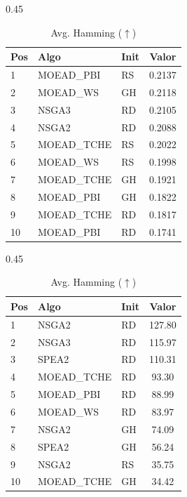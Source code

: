 \documentclass[a4paper,10pt]{article} %
\begin{document}
\begin{table}[H]
    \centering
    \begin{subtable}[t]{0.45\textwidth}
        \centering
        \caption{Avg. Tolerance Rate ($\uparrow$)}
        \begin{tabular}{lllc}
            \toprule
            Pos & Algo & Init & Valor \\
            \midrule
            1 & MOEAD\_PBI & RS & 0.2137 \\
            2 & MOEAD\_WS & GH & 0.2118 \\
            3 & NSGA3 & RD & 0.2105 \\
            4 & NSGA2 & RD & 0.2088 \\
            5 & MOEAD\_TCHE & RS & 0.2022 \\
            6 & MOEAD\_WS & RS & 0.1998 \\
            7 & MOEAD\_TCHE & GH & 0.1921 \\
            8 & MOEAD\_PBI & GH & 0.1822 \\
            9 & MOEAD\_TCHE & RD & 0.1817 \\
            10 & MOEAD\_PBI & RD & 0.1741 \\
            \bottomrule
        \end{tabular}
    \end{subtable}
    \hfill
    \begin{subtable}[t]{0.45\textwidth}
        \centering
        \caption{Avg. Hamming ($\uparrow$)}
        \begin{tabular}{lllc}
            \toprule
            Pos & Algo & Init & Valor \\
            \midrule
            1 & NSGA2 & RD & 127.80 \\
            2 & NSGA3 & RD & 115.97 \\
            3 & SPEA2 & RD & 110.31 \\
            4 & MOEAD\_TCHE & RD & 93.30 \\
            5 & MOEAD\_PBI & RD & 88.99 \\
            6 & MOEAD\_WS & RD & 83.97 \\
            7 & NSGA2 & GH & 74.09 \\
            8 & SPEA2 & GH & 56.24 \\
            9 & NSGA2 & RS & 35.75 \\
            10 & MOEAD\_TCHE & GH & 34.42 \\
            \bottomrule
        \end{tabular}
    \end{subtable}
\end{table}
\end{document}
